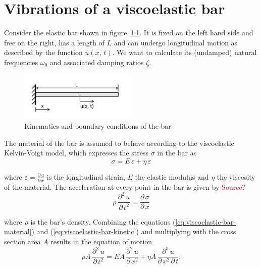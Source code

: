 \chapter{Vibrations of a viscoelastic bar}
\label{chapter:viscoelastic-bar-vibrations}

Consider the elastic bar shown in figure~\ref{fig:viscoelastic-bar}. It is fixed on the left hand side and free on the right, has a length of $L$ and can undergo longitudinal motion as described by the function $u(x,\,t)$. We want to calculate its (undamped) natural frequencies $\omega_0$ and associated damping ratios $\zeta$.

\begin{figure}[h]
\centering
\includegraphics[width=0.5\textwidth]{figures/appendix/viscoelastic-bar}
\caption{Kinematics and boundary conditions of the bar}
\label{fig:viscoelastic-bar}
\end{figure}

The material of the bar is assumed to behave according to the viscoelastic Kelvin-Voigt model, which expresses the stress $\sigma$ in the bar as
%
\begin{equation}
\sigma = E\,\varepsilon + \eta\,\dot{\varepsilon}\label{eq:viscoelastic-bar-material}
\end{equation}

where $\varepsilon = \frac{\partial\,u}{\partial\,x}$ is the longitudinal strain, $E$ the elastic modulus and $\eta$ the viscosity of the material. The acceleration at every point in the bar is given by \textcolor{red}{Source?}
%
\begin{equation}
\rho\,\frac{\partial^2\,u}{\partial\,t^2} = \frac{\partial\,\sigma}{\partial\,x}\label{eq:viscoelastic-bar-kinetic}
\end{equation}

where $\rho$ is the bar's density. Combining the equations (\ref{eq:viscoelastic-bar-material}) and (\ref{eq:viscoelastic-bar-kinetic}) and multiplying with the cross section area $A$ results in the equation of motion
%
\begin{equation}
\rho A\,\frac{\partial^2\,u}{\partial\,t^2} = EA\,\frac{\partial^2\,u}{\partial\,x^2} + \eta A\,\frac{\partial^3\,u}{\partial\,x^2\,\partial\,t}.\label{eq:viscoelastic-bar-motion}
\end{equation}

